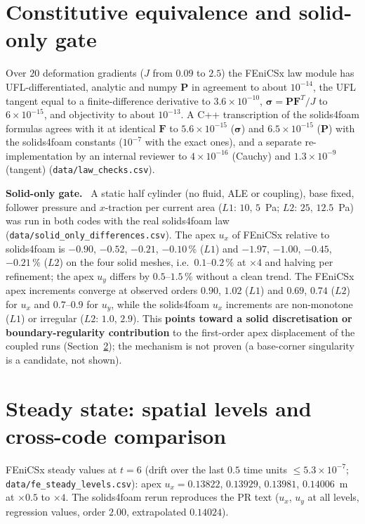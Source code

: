 \documentclass[sn-mathphys,Numbered]{sn-jnl}
\renewcommand{\paragraph}[1]{\par\vspace{0.3\baselineskip}\noindent\textbf{#1}\ }
\newcommand{\FE}{FEniCSx}
\begin{document}
\section{Constitutive equivalence and solid-only gate}\label{sec:nh_law}
Over $20$ deformation gradients ($J$ from $0.09$ to $2.5$) the \FE{} law module has UFL-differentiated, analytic and numpy $\bm P$ in agreement to about $10^{-14}$, the UFL tangent equal to a finite-difference derivative to $3.6\times10^{-10}$, $\bm\sigma=\bm P\bm F^{T}/J$ to $6\times10^{-15}$, and objectivity to about $10^{-13}$. A C++ transcription of the solids4foam formulas agrees with it at identical $\bm F$ to $5.6\times10^{-15}$ ($\bm\sigma$) and $6.5\times10^{-15}$ ($\bm P$) with the solids4foam constants ($10^{-7}$ with the exact ones), and a separate re-implementation by an internal reviewer to $4\times10^{-16}$ (Cauchy) and $1.3\times10^{-9}$ (tangent) (\texttt{data/law\_checks.csv}).

\paragraph{Solid-only gate.}
A static half cylinder (no fluid, ALE or coupling), base fixed, follower pressure and $x$-traction per current area ($L1$: $10,\,5$~Pa; $L2$: $25,\,12.5$~Pa) was run in both codes with the real solids4foam law (\texttt{data/solid\_only\_differences.csv}). The apex $u_x$ of \FE{} relative to solids4foam is $-0.90$, $-0.52$, $-0.21$, $-0.10\,\%$ ($L1$) and $-1.97$, $-1.00$, $-0.45$, $-0.21\,\%$ ($L2$) on the four solid meshes, i.e.\ $0.1$--$0.2\,\%$ at $\times4$ and halving per refinement; the apex $u_y$ differs by $0.5$--$1.5\,\%$ without a clean trend. The \FE{} apex increments converge at observed orders $0.90$, $1.02$ ($L1$) and $0.69$, $0.74$ ($L2$) for $u_x$ and $0.7$--$0.9$ for $u_y$, while the solids4foam $u_x$ increments are non-monotone ($L1$) or irregular ($L2$: $1.0$, $2.9$). This \textbf{points toward a solid discretisation or boundary-regularity contribution} to the first-order apex displacement of the coupled runs (Section~\ref{sec:nh_steady}); the mechanism is not proven (a base-corner singularity is a candidate, not shown).


\section{Steady state: spatial levels and cross-code comparison}\label{sec:nh_steady}
\FE{} steady values at $t=6$ (drift over the last $0.5$ time units $\le5.3\times10^{-7}$; \texttt{data/fe\_steady\_levels.csv}): apex $u_x=0.13822$, $0.13929$, $0.13981$, $0.14006$~m at $\times0.5$ to $\times4$. The solids4foam rerun reproduces the PR text ($u_x$, $u_y$ at all levels, regression values, order $2.00$, extrapolated $0.14024$).
\end{document}
